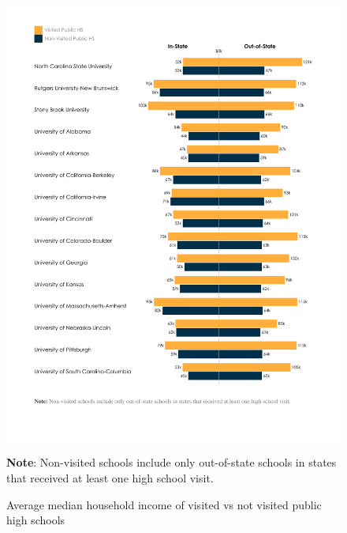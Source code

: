 \documentclass{article}
\begin{document}
\begin{figure}[!htp]
    \centering
    \vspace{-0.5cm}
    \includegraphics[width=\textwidth, trim={1.8cm, 3.6cm, 1.8cm, 1.3cm}, clip]{assets/graphs/income_graph.pdf}
    \begin{flushleft}\textbf{Note}: Non-visited schools include only out-of-state schools in states that received at least one high school visit.\end{flushleft}
    \caption{Average median household income of visited vs not visited public high schools}
    \label{fig:income_graph}
\end{figure}
\end{document}

